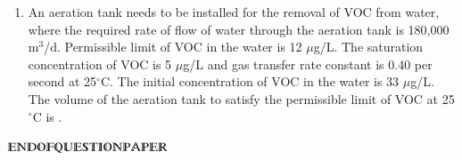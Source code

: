 \documentclass[journal,12pt,onecolumn]{IEEEtran}
\theoremstyle{remark}
\begin{document}
\begin{enumerate}
\item An aeration tank needs to be installed for the removal of VOC from water, where the required rate of flow of water through the aeration tank is 180,000 m$^3$/d. Permissible limit of VOC in the water is 12 $\mu$g/L. The saturation concentration of VOC is 5 $\mu$g/L and gas transfer rate constant is 0.40 per second at 25$^\circ$C. The initial concentration of VOC in the water is 33 $\mu$g/L. The volume of the aeration tank to satisfy the permissible limit of VOC at 25$^\circ$C is \underline{\hspace{2cm}} .  
\hfill{}
\end{enumerate}
\centering
$\varmathbb{END OF QUESTION PAPER}$
\end{document}
